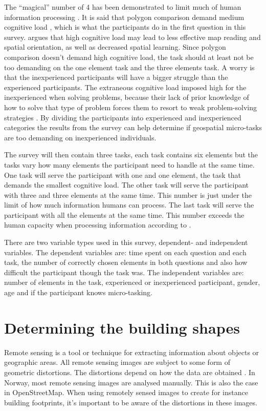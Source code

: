 The “magical” number of 4 has been demonstrated to limit much of human information processing \citep{Mandler2013}. It is said that polygon comparison demand medium cognitive load \citep{Kiefer2016}, which is what the participants do in the first question in this survey. \cite{Kiefer2016} argues that high cognitive load may lead to less effective map reading and spatial orientation, as well as decreased spatial learning. Since polygon comparison doesn't demand high cognitive load, the task should at least not be too demanding on the one element task and the three elements task. A worry is that the inexperienced participants will have a bigger struggle than the experienced participants. The extraneous cognitive load imposed high for the inexperienced when solving problems, because their lack of prior knowledge of how to solve that type of problem forces them to resort to weak problem-solving strategies \citep{Leppink2014a}. By dividing the participants into experienced and inexperienced categories the results from the survey can help determine if geospatial micro-tasks are too demanding on inexperienced individuals. 

The survey will then contain three tasks, each task contains six elements but the tasks vary how many elements the participant need to handle at the same time. One task will serve the participant with one and one element, the task that demands the smallest cognitive load. The other task will serve the participant with three and three elements at the same time. This number is just under the limit of how much information humans can process. The last task will serve the participant with all the elements at the same time. This number exceeds the human capacity when processing information according to \cite{Leppink2014a}. 

There are two variable types used in this survey, dependent- and independent variables. The dependent variables are: time spent on each question and each task, the number of correctly chosen elements in both questions and also how difficult the participant though the task was. The independent variables are: number of elements in the task, experienced or inexperienced participant, gender, age and if the participant knows micro-tasking. 

\section[Building shapes]{Determining the building shapes}
Remote sensing is a tool or technique for extracting information about objects or geographic areas. All remote sensing images are subject to some form of geometric distortions. The distortions depend on how the data are obtained \citep{Toutin2004}.  In Norway, most remote sensing images are analysed manually. This is also the case in OpenStreetMap. When using remotely sensed images to create for instance building footprints, it's important to be aware of the distortions in these images. 

